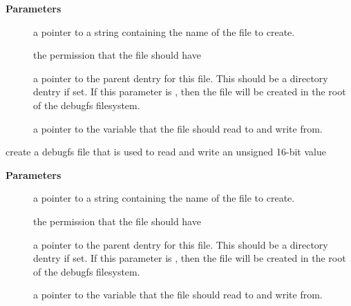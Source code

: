 \documentclass[a4paper,8pt,english]{sphinxmanual}
\begin{document}
\textbf{Parameters}
\begin{description}
\item[{}] \leavevmode
a pointer to a string containing the name of the file to create.

\item[{}] \leavevmode
the permission that the file should have

\item[{}] \leavevmode
a pointer to the parent dentry for this file.  This should be a
directory dentry if set.  If this parameter is , then the
file will be created in the root of the debugfs filesystem.

\item[{}] \leavevmode
a pointer to the variable that the file should read to and write
from.

\end{description}

\begin{fulllineitems}
\label{filesystems/index:c.debugfs_create_x16}
create a debugfs file that is used to read and write an unsigned 16-bit value

\end{fulllineitems}


\textbf{Parameters}
\begin{description}
\item[{}] \leavevmode
a pointer to a string containing the name of the file to create.

\item[{}] \leavevmode
the permission that the file should have

\item[{}] \leavevmode
a pointer to the parent dentry for this file.  This should be a
directory dentry if set.  If this parameter is , then the
file will be created in the root of the debugfs filesystem.

\item[{}] \leavevmode
a pointer to the variable that the file should read to and write
from.

\end{description}
\end{document}
